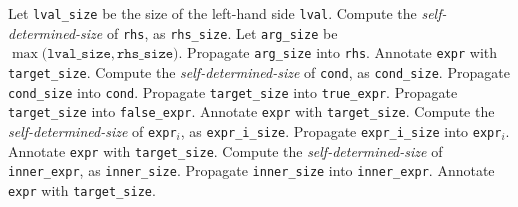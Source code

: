 \documentclass{article}
\newcommand{\sds}{\emph{self-determined-size}}
\begin{document}
\begin{algorithm}
  \begin{algorithmic}[1]
    \State Let \texttt{lval\_size} be the size of the left-hand side \texttt{lval}.
    \State Compute the \sds{} of \texttt{rhs}, as \texttt{rhs\_size}.
    \State Let \texttt{arg\_size} be $\max\big(\texttt{lval\_size}, \texttt{rhs\_size}\big)$.
    \State Propagate \texttt{arg\_size} into \texttt{rhs}.
    \State Annotate \texttt{expr} with \texttt{target\_size}.
    \ENDWHEN
    \State Compute the \sds{} of \texttt{cond}, as \texttt{cond\_size}.
    \State Propagate \texttt{cond\_size} into \texttt{cond}.
    \State Propagate \texttt{target\_size} into \texttt{true\_expr}.
    \State Propagate \texttt{target\_size} into \texttt{false\_expr}.
    \State Annotate \texttt{expr} with \texttt{target\_size}.
    \ENDWHEN
    \State Compute the \sds{} of \texttt{expr}$_{i}$, as \texttt{expr\_i\_size}.
    \State Propagate \texttt{expr\_i\_size} into \texttt{expr}$_{i}$.
    \EndFor
    \State Annotate \texttt{expr} with \texttt{target\_size}.
    \ENDWHEN
    \State Compute the \sds{} of \texttt{inner\_expr}, as \texttt{inner\_size}.
    \State Propagate \texttt{inner\_size} into \texttt{inner\_expr}.
    \State Annotate \texttt{expr} with \texttt{target\_size}.
    \ENDWHEN
    \ENDSWITCH
    \EndProcedure
  \end{algorithmic}
\end{algorithm}
\end{document}
